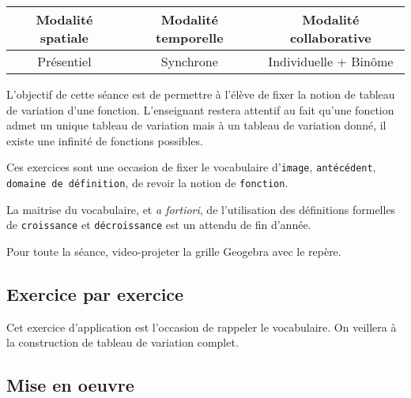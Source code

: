 \begin{tabular}{|c|c|c|}
\hline 
Modalité spatiale & Modalité temporelle & Modalité collaborative \\ 
\hline 
Présentiel & Synchrone & Individuelle + Binôme \\ 
\hline 
\end{tabular} 


L'objectif de cette séance est de permettre à l'élève de fixer la notion de tableau de variation d'une fonction. L'enseignant restera attentif au fait qu'une fonction admet un unique tableau de variation mais à un tableau de variation donné, il existe une infinité de fonctions possibles.

Ces exercices sont une occasion de fixer le vocabulaire d'\texttt{image}, \texttt{antécédent}, \texttt{domaine de définition}, de revoir la notion de \texttt{fonction}.

La maitrise du vocabulaire, et \textit{a fortiori}, de l'utilisation des définitions formelles de \texttt{croissance} et \texttt{décroissance} est un attendu de fin d'année.


\begin{MEO}
Pour toute la séance, video-projeter la grille Geogebra avec le repère.
\end{MEO}


\subsection{Exercice par exercice}


Cet exercice d'application est l'occasion de rappeler le vocabulaire. On veillera à la construction de tableau de variation complet.

\subsection{Mise en oeuvre}

